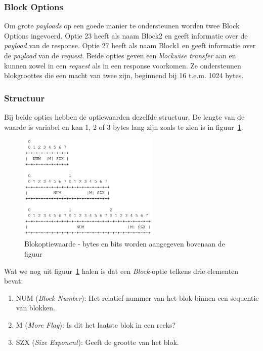 \subsubsection{Block Options}
Om grote \textit{payloads} op een goede manier te ondersteunen worden twee Block Options ingevoerd. Optie 23 heeft als naam Block2 en geeft informatie over de \textit{payload} van de response. Optie 27 heeft als naam Block1 en geeft informatie over de \textit{payload} van de \textit{request}. Beide opties  geven een \textit{blockwise transfer} aan en kunnen zowel in een \textit{request} als in een response voorkomen. Ze ondersteunen blokgroottes die een macht van twee zijn, beginnend bij 16 t.e.m. 1024 bytes.

\subsubsection{Structuur}
Bij beide opties hebben de optiewaarden dezelfde structuur. De lengte van de waarde is variabel en kan 1, 2 of 3 bytes lang zijn zoals te zien is in figuur~\ref{fig:blockOption}.
\begin{figure}[h]
\centering
\includegraphics[width=0.6\textwidth]{fig/blockOption}
\caption{Blokoptiewaarde - bytes en bits worden aangegeven bovenaan de figuur}
\label{fig:blockOption}
\end{figure}

\noindent
Wat we nog uit figuur~\ref{fig:blockOption} halen is dat een \textit{Block}-optie telkens drie elementen bevat:
\begin{enumerate}
\item NUM (\textit{Block Number}): Het relatief nummer van het blok binnen een sequentie van blokken.
\item M (\textit{More Flag}): Is dit het laatste blok in een reeks?
\item SZX (\textit{Size Exponent}): Geeft de grootte van het blok.
\end{enumerate}


